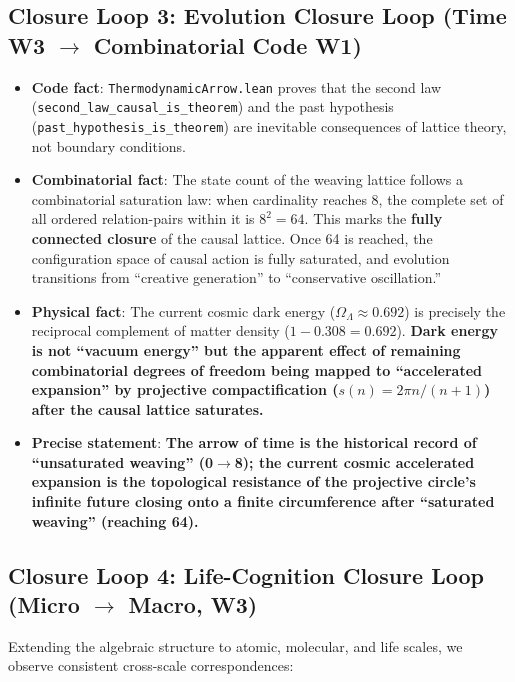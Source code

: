 \documentclass[aps,prd,twocolumn,nofootinbib,floatfix]{revtex4-2}
\begin{document}
\subsection{Closure Loop 3: Evolution Closure Loop (Time W3 $\to$ Combinatorial Code W1)}

\begin{itemize}
    \item \textbf{Code fact}: \texttt{ThermodynamicArrow.lean} proves that the second law (\texttt{second\_law\_causal\_is\_theorem}) and the past hypothesis (\texttt{past\_hypothesis\_is\_theorem}) are inevitable consequences of lattice theory, not boundary conditions.
    \item \textbf{Combinatorial fact}: The state count of the weaving lattice follows a combinatorial saturation law: when cardinality reaches 8, the complete set of all ordered relation-pairs within it is $8^2 = 64$. This marks the \textbf{fully connected closure} of the causal lattice. Once 64 is reached, the configuration space of causal action is fully saturated, and evolution transitions from ``creative generation'' to ``conservative oscillation.''
    \item \textbf{Physical fact}: The current cosmic dark energy ($\Omega_\Lambda \approx 0.692$) is precisely the reciprocal complement of matter density ($1 - 0.308 = 0.692$). \textbf{Dark energy is not ``vacuum energy'' but the apparent effect of remaining combinatorial degrees of freedom being mapped to ``accelerated expansion'' by projective compactification ($s(n) = 2\pi n/(n+1)$) after the causal lattice saturates.}
    \item \textbf{Precise statement}: \textbf{The arrow of time is the historical record of ``unsaturated weaving'' (0$\to$8); the current cosmic accelerated expansion is the topological resistance of the projective circle's infinite future closing onto a finite circumference after ``saturated weaving'' (reaching 64).}
\end{itemize}

\subsection{Closure Loop 4: Life-Cognition Closure Loop (Micro $\to$ Macro, W3)}

Extending the algebraic structure to atomic, molecular, and life scales, we observe consistent cross-scale correspondences:
\end{document}
